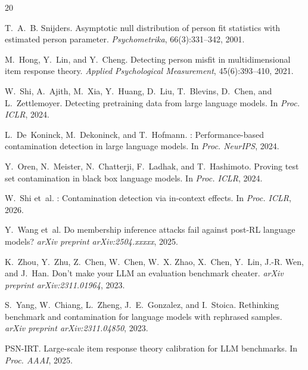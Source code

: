 \documentclass[11pt,a4paper]{article}
\begin{document}

\begin{thebibliography}{20}

T.~A.~B. Snijders.
\newblock Asymptotic null distribution of person fit statistics with estimated person parameter.
\newblock \emph{Psychometrika}, 66(3):331--342, 2001.

M.~Hong, Y.~Lin, and Y.~Cheng.
\newblock Detecting person misfit in multidimensional item response theory.
\newblock \emph{Applied Psychological Measurement}, 45(6):393--410, 2021.

W.~Shi, A.~Ajith, M.~Xia, Y.~Huang, D.~Liu, T.~Blevins, D.~Chen, and L.~Zettlemoyer.
\newblock Detecting pretraining data from large language models.
\newblock In \emph{Proc. ICLR}, 2024.

L.~De~Koninck, M.~Dekoninck, and T.~Hofmann.
: Performance-based contamination detection in large language models.
\newblock In \emph{Proc. NeurIPS}, 2024.

Y.~Oren, N.~Meister, N.~Chatterji, F.~Ladhak, and T.~Hashimoto.
\newblock Proving test set contamination in black box language models.
\newblock In \emph{Proc. ICLR}, 2024.

W.~Shi et~al.
: Contamination detection via in-context effects.
\newblock In \emph{Proc. ICLR}, 2026.

Y.~Wang et~al.
\newblock Do membership inference attacks fail against post-RL language models?
\newblock \emph{arXiv preprint arXiv:2504.xxxxx}, 2025.

K.~Zhou, Y.~Zhu, Z.~Chen, W.~Chen, W.~X. Zhao, X.~Chen, Y.~Lin, J.-R. Wen, and J.~Han.
\newblock Don't make your {LLM} an evaluation benchmark cheater.
\newblock \emph{arXiv preprint arXiv:2311.01964}, 2023.

S.~Yang, W.~Chiang, L.~Zheng, J.~E.~Gonzalez, and I.~Stoica.
\newblock Rethinking benchmark and contamination for language models with rephrased samples.
\newblock \emph{arXiv preprint arXiv:2311.04850}, 2023.

{PSN-IRT}.
\newblock Large-scale item response theory calibration for {LLM} benchmarks.
\newblock In \emph{Proc. AAAI}, 2025.

\end{thebibliography}
\end{document}
